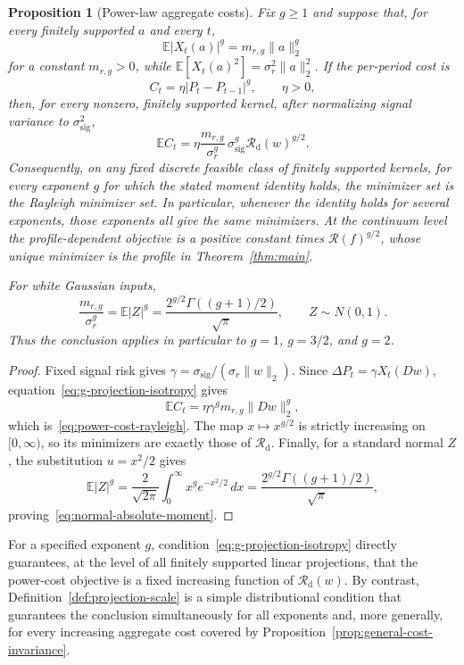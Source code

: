 \documentclass[11pt]{amsart}
\newtheorem{proposition}[theorem]{Proposition}
\theoremstyle{definition}
\theoremstyle{remark}
\newcommand{\Rcal}{\mathcal R}
\begin{document}
\begin{proposition}[Power-law aggregate costs]\label{prop:power-cost}
Fix $g\geq1$ and suppose that, for every finitely supported $a$ and every $t$,
\begin{equation}\label{eq:g-projection-isotropy}
 \mathbb E|X_t(a)|^g=m_{r,g}\|a\|_2^g
\end{equation}
for a constant $m_{r,g}>0$, while
$\mathbb E[X_t(a)^2]=\sigma_r^2\|a\|_2^2$. If the per-period cost is
\[
 C_t=\eta|P_t-P_{t-1}|^g,
 \qquad \eta>0,
\]
then, for every nonzero, finitely supported kernel, after normalizing signal
variance to $\sigma_{\mathrm{sig}}^2$,
\begin{equation}\label{eq:power-cost-rayleigh}
 \mathbb E C_t
 =\eta\frac{m_{r,g}}{\sigma_r^g}\,
     \sigma_{\mathrm{sig}}^g\Rcal_{\mathrm d}(w)^{g/2}.
\end{equation}
Consequently, on any fixed discrete feasible class of finitely supported
kernels, for every exponent $g$ for which the stated moment identity holds,
the minimizer set is the Rayleigh minimizer set. In particular, whenever the
identity holds for several exponents, those exponents all give the same
minimizers. At the continuum level the profile-dependent objective is
a positive constant times $\Rcal(f)^{g/2}$, whose unique minimizer is the
profile in Theorem~\ref{thm:main}.

For white Gaussian inputs,
\begin{equation}\label{eq:normal-absolute-moment}
 \frac{m_{r,g}}{\sigma_r^g}
 =\mathbb E|Z|^g
 =\frac{2^{g/2}\Gamma((g+1)/2)}{\sqrt\pi},
 \qquad Z\sim N(0,1).
\end{equation}
Thus the conclusion applies in particular to $g=1$, $g=3/2$, and $g=2$.
\end{proposition}
\begin{proof}
Fixed signal risk gives
$\gamma=\sigma_{\mathrm{sig}}/(\sigma_r\|w\|_2)$. Since
$\Delta P_t=\gamma X_t(Dw)$, equation~\eqref{eq:g-projection-isotropy} gives
\[
 \mathbb E C_t
 =\eta\gamma^gm_{r,g}\|Dw\|_2^g,
\]
which is~\eqref{eq:power-cost-rayleigh}. The map
$x\mapsto x^{g/2}$ is strictly increasing on $[0,\infty)$, so its minimizers
are exactly those of $\Rcal_{\mathrm d}$. Finally, for a standard normal $Z$,
the substitution $u=x^2/2$ gives
\[
 \mathbb E|Z|^g
 =\frac{2}{\sqrt{2\pi}}\int_0^\infty x^ge^{-x^2/2}\,dx
 =\frac{2^{g/2}\Gamma((g+1)/2)}{\sqrt\pi},
\]
proving~\eqref{eq:normal-absolute-moment}.
\end{proof}

For a specified exponent $g$, condition~\eqref{eq:g-projection-isotropy}
directly guarantees, at the level of all finitely supported linear
projections, that the power-cost objective is a fixed increasing function of
$\Rcal_{\mathrm d}(w)$. By contrast,
Definition~\ref{def:projection-scale} is a simple distributional condition
that guarantees the conclusion simultaneously for all exponents and, more
generally, for every increasing aggregate cost covered by
Proposition~\ref{prop:general-cost-invariance}.
\end{document}
